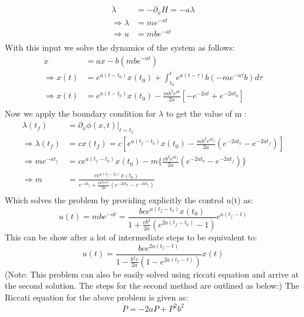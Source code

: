 \begin{enumerate}
\begin{align*}
   \dot \lambda &= - \partial_x H = -a \lambda \\
   \Rightarrow \lambda &= m e^{-at}\\
   \Rightarrow u &= m b e^{-at}\\
  \end{align*}
  With this input we solve the dynamics of the system as follows:
  \begin{align*}
   \dot x &= ax - b(m b e^{-at}) \\
   \Rightarrow x(t) &= e^{a(t-t_0)} x(t_0) + \int_{t_0}^{t} e^{a(t-\tau)} b \left( -m e^{-a \tau } b \right) d\tau\\
   \Rightarrow x(t) &= e^{a(t-t_0)} x(t_0) - \frac{m b^2 e^{at}}{2a} \left[ -e^{-2at} + e^{-2at_0}\right]\\
  \end{align*}
  Now we apply the boundary condition for $\lambda$ to get the value of m :
  \begin{align*}
   \lambda(t_f) &= \left. \partial_x \phi(x,t) \right|_{t=t_f} \\
   \Rightarrow \lambda(t_f) &= c x(t_f) = c \left[e^{a(t_f-t_0)} x(t_0) - \frac{m b^2 e^{at_f}}{2a} \left( e^{-2at_0} - e^{-2at_f}\right) \right]\\
   \Rightarrow m e^{-at_f} &= c e^{a(t_f - t_0)} x(t_0) - m \{ \frac{cb^2 e^{at_f}}{2a} \left(e^{-2at_0} - e^{-2at_f}\right)\}\\
   \Rightarrow m &= \frac{c e^{a(t_f - t_0)} x(t_0)} { e^{-at_f} + \frac{cb^2 e^{at_f}}{2a}\left( e^{-2at_0} - e^{-2at_f}\right)}\\
  \end{align*}
  Which solves the problem by providing explicitly the control u(t) as:
  \begin{equation*}
  u(t) = mbe^{-at} = \frac{bc e^{a(t_f - t_0)} x(t_0)} { 1 + \frac{cb^2}{2a}\left( e^{2a(t_f-t_0)}-1\right)}e^{a(t_f-t)}
  \end{equation*}
  This can be show after a lot of intermediate steps to be equivalent to:
  \begin{equation*}
   u(t) = \frac{bc e^{2a(t_f - t)}}{1 - \frac{b^2 c}{2a} \left( 1 - e^{2a(t_f - t)}\right)}x(t)
  \end{equation*}
  (Note: This problem can also be easily solved using riccati equation and arrive at the second solution. The steps for the second method are outlined as below:)
  The Riccati equation for the above problem is given as:
  \begin{equation*}
   \dot P = -2aP + P^2 b^2
  \end{equation*}

\end{enumerate}
